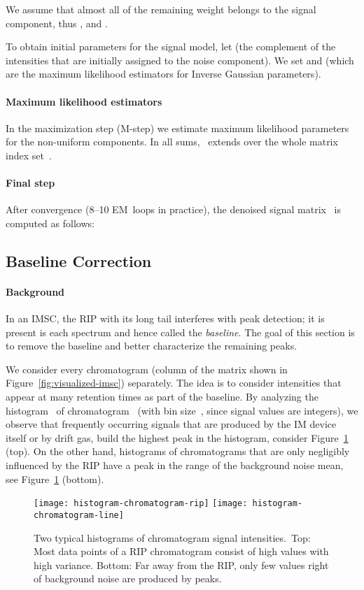 \documentclass{article}
\begin{document}
We assume that almost all of the remaining weight belongs to the signal component, thus , and . 

To obtain initial parameters for the signal model, let  (the complement of the intensities that are initially assigned to the noise component).
We set  and  (which are the maximum likelihood estimators for Inverse Gaussian parameters).

\paragraph*{Maximum likelihood estimators}
In the maximization step (M-step) we estimate maximum likelihood parameters for the non-uniform components.
In all sums,~ extends over the whole matrix index set~.

\paragraph*{Final step}
After convergence (8--10 EM~loops in practice), the denoised signal matrix~ is computed as follows:

\subsection{Baseline Correction}
\label{sec:baseline}

\paragraph*{Background}
In an IMSC, the RIP with its long tail interferes with peak detection; it is present is each spectrum and hence called the \emph{baseline}.
The goal of this section is to remove the baseline and better characterize the remaining peaks.

We consider every chromatogram (column of the matrix shown in Figure~\ref{fig:visualized-imsc}) separately.
The idea is to consider intensities that appear at many retention times as part of the baseline.
By analyzing the histogram~ of chromatogram~ (with bin size~, since signal values are integers), we observe that frequently occurring signals that are produced by the IM device itself or by drift gas, build the highest peak in the histogram, consider Figure~\ref{fig:histogram-chromatograms} (top).
On the other hand, histograms of chromatograms that are only negligibly influenced by the RIP have a peak in the range of the background noise mean, see Figure~\ref{fig:histogram-chromatograms} (bottom).
\begin{figure}[t]\centering
\texttt{[image: histogram-chromatogram-rip]}
\texttt{[image: histogram-chromatogram-line]}
\caption{Two typical histograms of chromatogram signal intensities.\
Top: Most data points of a RIP chromatogram consist of high values with high variance.
Bottom: Far away from the RIP, only few values right of background noise are produced by peaks.
}
\label{fig:histogram-chromatograms}
\end{figure}
\end{document}
